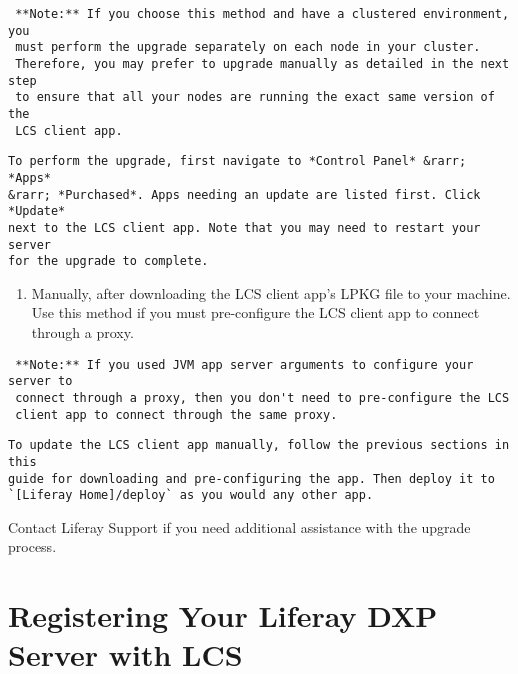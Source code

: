 \noindent\hrulefill

\begin{verbatim}
 **Note:** If you choose this method and have a clustered environment, you 
 must perform the upgrade separately on each node in your cluster. 
 Therefore, you may prefer to upgrade manually as detailed in the next step 
 to ensure that all your nodes are running the exact same version of the 
 LCS client app. 
\end{verbatim}

\noindent\hrulefill

\begin{verbatim}
To perform the upgrade, first navigate to *Control Panel* &rarr; *Apps* 
&rarr; *Purchased*. Apps needing an update are listed first. Click *Update* 
next to the LCS client app. Note that you may need to restart your server 
for the upgrade to complete. 
\end{verbatim}

\begin{enumerate}
\def\labelenumi{\arabic{enumi}.}
\setcounter{enumi}{1}
\tightlist
\item
  Manually, after downloading the LCS client app's LPKG file to your
  machine. Use this method if you must pre-configure the LCS client app
  to connect through a proxy.
\end{enumerate}

\noindent\hrulefill

\begin{verbatim}
 **Note:** If you used JVM app server arguments to configure your server to 
 connect through a proxy, then you don't need to pre-configure the LCS 
 client app to connect through the same proxy. 
\end{verbatim}

\noindent\hrulefill

\begin{verbatim}
To update the LCS client app manually, follow the previous sections in this
guide for downloading and pre-configuring the app. Then deploy it to
`[Liferay Home]/deploy` as you would any other app. 
\end{verbatim}

Contact Liferay Support if you need additional assistance with the
upgrade process.

\chapter{Registering Your Liferay DXP Server with
LCS}\label{registering-your-liferay-dxp-server-with-lcs}

